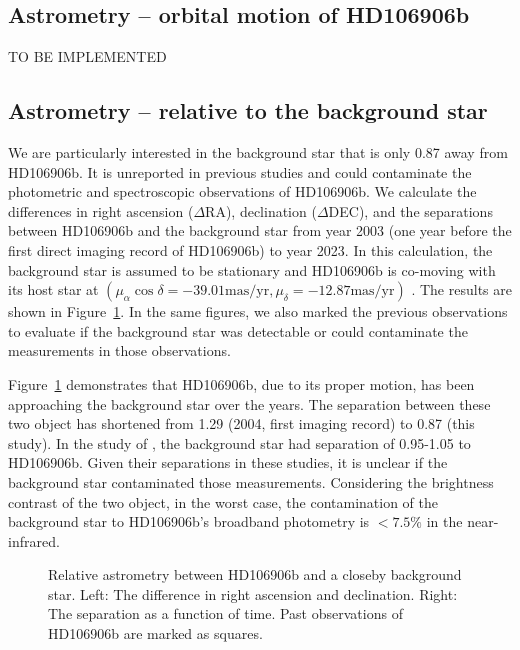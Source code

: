 \documentclass[twocolumn]{aastex62}
\begin{document}
\subsection{Astrometry -- orbital motion of HD106906b}
TO BE IMPLEMENTED

\subsection{Astrometry -- relative to the background star}
\label{sec:astrometry}
We are particularly interested in the background star that is only 0\arcsec{}.87 away from HD106906b. It is unreported in previous studies and could contaminate the photometric and spectroscopic observations of HD106906b.  We calculate the differences in right ascension ($\Delta$RA),  declination ($\Delta$DEC), and the separations between HD106906b and the background star from year 2003 (one year before the first direct imaging record of HD106906b) to year 2023. In this calculation, the background star is assumed to be stationary and HD106906b is co-moving with its host star at $(\mu_\alpha\cos\delta=-39.01 \mbox{mas/yr}, \mu_{\delta}=-12.87 \mbox{mas/yr})$ \citep{Gaia2016, Gaia2018}. The results are shown in Figure~\ref{fig:astrometry:bck}. In the same figures, we also marked the previous observations \citep{Bailey2013, Wu2016, Lagrange2016, Daemgen2017} to evaluate if the background star was detectable or could contaminate the measurements in those observations.

Figure~\ref{fig:astrometry:bck} demonstrates that HD106906b, due to its proper motion, has been approaching  the background star over the years. The separation between these two object has shortened from 1\arcsec.29 (2004, first imaging record) to 0\arcsec.87 (this study). In the study of \citep{Bailey2013, Wu2016, Daemgen2017}, the background star had separation of 0.95-1.05 to HD106906b. Given their separations in these studies, it is unclear if the background star contaminated those measurements. Considering the brightness contrast of the two object, in the worst case, the contamination of the background star to HD106906b's broadband photometry is  $<7.5\%$ in the near-infrared.

\begin{figure}
  \centering
  \caption{Relative astrometry between HD106906b and a closeby background star. Left: The difference in right ascension and declination. Right: The separation as a function of time. Past observations of HD106906b are marked as squares.}
  \label{fig:astrometry:bck}
\end{figure}
\end{document}
